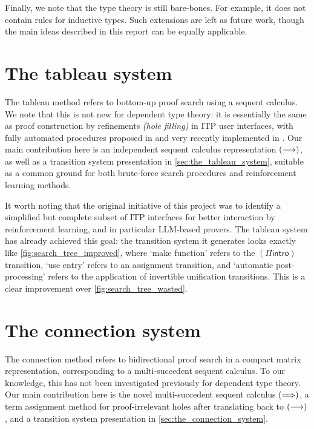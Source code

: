 \documentclass[twoside]{report}
\begin{document}
Finally, we note that the type theory is still bare-bones. For example, it does not contain rules for inductive types. Such extensions are left as future work, though the main ideas described in this report can be equally applicable.

\section{The tableau system}
\label{sec:evaluation_tableau_system}

The tableau method refers to bottom-up proof search using a sequent calculus. We note that this is not new for dependent type theory: it is essentially the same as proof construction by refinements \emph{(hole filling)} in ITP user interfaces, with fully automated procedures proposed in \cite{pym1990proofs,dowek1993complete} and very recently implemented in \cite{norman2025canonical}. Our main contribution here is an independent sequent calculus representation $(\longrightarrow)$, as well as a transition system presentation in \cref{sec:the_tableau_system}, suitable as a common ground for both brute-force search procedures and reinforcement learning methods.

It worth noting that the original initiative of this project was to identify a simplified but complete subset of ITP interfaces for better interaction by reinforcement learning, and in particular LLM-based provers. The tableau system has already achieved this goal: the transition system it generates looks exactly like \cref{fig:search_tree_improved}, where `make function' refers to the $(\Pi\mathsf{intro})$ transition, `use entry' refers to an assignment transition, and `automatic post-processing' refers to the application of invertible unification transitions. This is a clear improvement over \cref{fig:search_tree_wasted}.

\section{The connection system}
\label{sec:evaluation_connection_system}

The connection method refers to bidirectional proof search in a compact matrix representation, corresponding to a multi-succedent sequent calculus. To our knowledge, this has not been investigated previously for dependent type theory. Our main contribution here is the novel multi-succedent sequent calculus $(\Longrightarrow)$, a term assignment method for proof-irrelevant holes after translating back to $(\longrightarrow)$, and a transition system presentation in \cref{sec:the_connection_system}.
\end{document}
